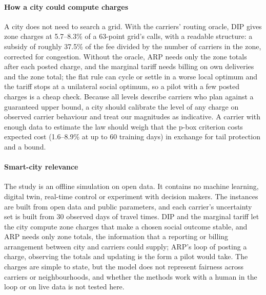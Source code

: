 \documentclass[preprint,11pt]{elsarticle}
\theoremstyle{definition}
\theoremstyle{remark}
\begin{document}
\paragraph{How a city could compute charges} A city does not need to search a grid. With the carriers' routing oracle, DIP gives zone charges at 5.7--8.3\% of a 63-point grid's calls, with a readable structure: a subsidy of roughly 37.5\% of the fee divided by the number of carriers in the zone, corrected for congestion. Without the oracle, ARP needs only the zone totals after each posted charge, and the marginal tariff needs billing on own deliveries and the zone total; the flat rule can cycle or settle in a worse local optimum and the tariff stops at a unilateral social optimum, so a pilot with a few posted charges is a cheap check. Because all levels describe carriers who plan against a guaranteed upper bound, a city should calibrate the level of any charge on observed carrier behaviour and treat our magnitudes as indicative. A carrier with enough data to estimate the law should weigh that the p-box criterion costs expected cost (1.6--8.9\% at up to 60 training days) in exchange for tail protection and a bound.

\paragraph{Smart-city relevance} The study is an offline simulation on open data. It contains no machine learning, digital twin, real-time control or experiment with decision makers. The instances are built from open data and public parameters, and each carrier's uncertainty set is built from 30 observed days of travel times. DIP and the marginal tariff let the city compute zone charges that make a chosen social outcome stable, and ARP needs only zone totals, the information that a reporting or billing arrangement between city and carriers could supply; ARP's loop of posting a charge, observing the totals and updating is the form a pilot would take. The charges are simple to state, but the model does not represent fairness across carriers or neighbourhoods, and whether the methods work with a human in the loop or on live data is not tested here.
\end{document}
